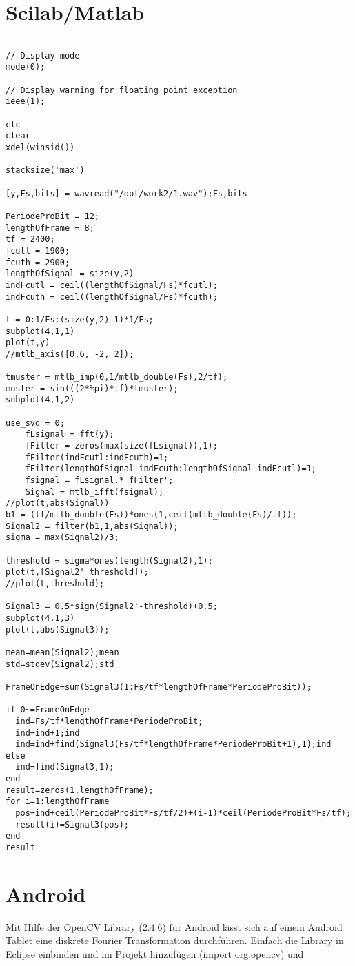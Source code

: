 \documentclass[10pt]{article}
\begin{document}
\part{Scilab/Matlab}
\begin{tiny}
\begin{lstlisting}

// Display mode
mode(0);

// Display warning for floating point exception
ieee(1);

clc
clear
xdel(winsid())

stacksize('max')

[y,Fs,bits] = wavread("/opt/work2/1.wav");Fs,bits

PeriodeProBit = 12;
lengthOfFrame = 8;
tf = 2400;
fcutl = 1900;
fcuth = 2900;
lengthOfSignal = size(y,2)
indFcutl = ceil((lengthOfSignal/Fs)*fcutl);
indFcuth = ceil((lengthOfSignal/Fs)*fcuth);

t = 0:1/Fs:(size(y,2)-1)*1/Fs;
subplot(4,1,1)
plot(t,y)
//mtlb_axis([0,6, -2, 2]);

tmuster = mtlb_imp(0,1/mtlb_double(Fs),2/tf);
muster = sin(((2*%pi)*tf)*tmuster);
subplot(4,1,2)

use_svd = 0;
    fLsignal = fft(y);
    fFilter = zeros(max(size(fLsignal)),1);
    fFilter(indFcutl:indFcuth)=1;
    fFilter(lengthOfSignal-indFcuth:lengthOfSignal-indFcutl)=1;
    fsignal = fLsignal.* fFilter';
    Signal = mtlb_ifft(fsignal);
//plot(t,abs(Signal))
b1 = (tf/mtlb_double(Fs))*ones(1,ceil(mtlb_double(Fs)/tf));
Signal2 = filter(b1,1,abs(Signal));
sigma = max(Signal2)/3;

threshold = sigma*ones(length(Signal2),1);
plot(t,[Signal2' threshold]);
//plot(t,threshold);

Signal3 = 0.5*sign(Signal2'-threshold)+0.5;
subplot(4,1,3)
plot(t,abs(Signal3));

mean=mean(Signal2);mean
std=stdev(Signal2);std

FrameOnEdge=sum(Signal3(1:Fs/tf*lengthOfFrame*PeriodeProBit));

if 0~=FrameOnEdge
  ind=Fs/tf*lengthOfFrame*PeriodeProBit;
  ind=ind+1;ind
  ind=ind+find(Signal3(Fs/tf*lengthOfFrame*PeriodeProBit+1),1);ind
else
  ind=find(Signal3,1);
end
result=zeros(1,lengthOfFrame);
for i=1:lengthOfFrame
  pos=ind+ceil(PeriodeProBit*Fs/tf/2)+(i-1)*ceil(PeriodeProBit*Fs/tf);
  result(i)=Signal3(pos);
end
result

\end{lstlisting}
\end{tiny}
\part{Android}
Mit Hilfe der OpenCV Library (2.4.6) für Android lässt sich auf einem Android Tablet eine diskrete Fourier Transformation durchführen. Einfach die Library in Eclipse einbinden und im Projekt hinzufügen (import org.opencv) und
\end{document}
